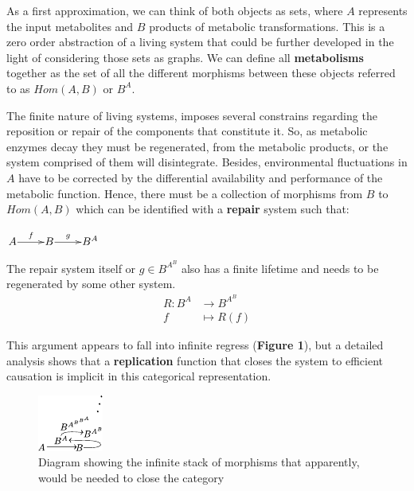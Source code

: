 \documentclass[aps,twocolumn]{revtex4-1}
\begin{document}
As a first approximation, we can think of both objects as sets, where $A$ represents the input metabolites and $B$  products of metabolic transformations. This is a zero order abstraction of a living system that could be further developed in the light of considering those sets as graphs. We can define all \textbf{metabolisms} together as the set of all the different morphisms between these objects referred to as $Hom(A,B)$ or $B^A$.

The finite nature of living systems, imposes several constrains regarding the reposition or repair of the components that constitute it. So, as metabolic enzymes decay they must be regenerated, from the metabolic products, or the system comprised of them will disintegrate. Besides, environmental fluctuations in $A$ have to be corrected by the differential availability and performance of the metabolic function. Hence, there must be a collection of morphisms from $B$ to $Hom(A,B)$ which can be identified with a \textbf{repair} system such that:


\begin{center}
	$
	\xymatrix@1{
	A\ar[r]^f &B\ar[r]^-g & B^A}
	$
\end{center}


 The repair system itself or $g \in B^{A^B}$ also has a finite lifetime and needs to be regenerated by some other system.
 \begin{align*}
R: B^A & \longrightarrow B^{A^B}\\
f & \longmapsto R(f)
\end{align*}	

This argument appears to fall into infinite regress (\textbf{Figure 1}), but a detailed analysis shows that a \textbf{replication} function that closes the system to efficient causation is implicit in this categorical representation.

\begin{figure}
\noindent\includegraphics[width=0.45\columnwidth]{fig/mrcatinf.pdf}
\caption{Diagram showing the infinite stack of morphisms that apparently, would be needed to close the category}
\label{fig:hom}
\end{figure}
\end{document}
